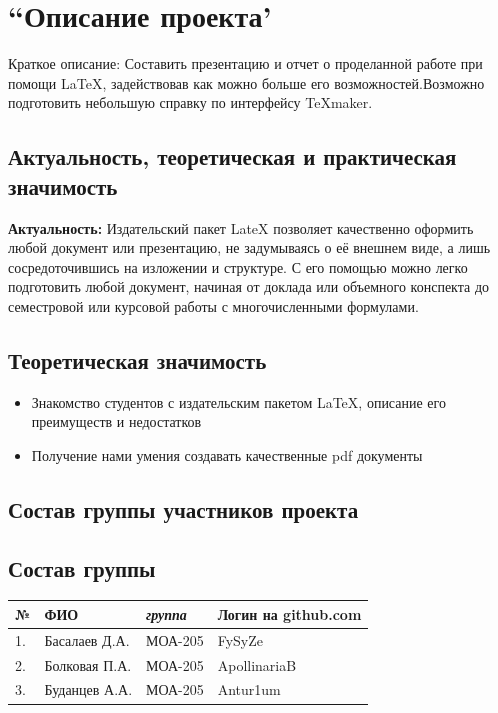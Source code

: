 \documentclass[14pt, a4paper]{extarticle}
\begin{document}
\newpage%
\tableofcontents


\newpage%
\section{``Описание проекта'}
Краткое описание: Составить презентацию и отчет о проделанной работе при помощи \LaTeX, задействовав как можно больше его возможностей.Возможно подготовить небольшую справку по интерфейсу \TeX maker.
\subsection{Актуальность, теоретическая и практическая значимость}
\textbf{Актуальность:}
Издательский пакет LateX позволяет качественно оформить любой документ или презентацию, не задумываясь о её внешнем виде, а лишь сосредоточившись на изложении и структуре. С его помощью можно легко подготовить любой документ, начиная от доклада или объемного конспекта до семестровой или курсовой работы с многочисленными формулами.
\subsection{Теоретическая значимость}
\begin{itemize}
  \item Знакомство студентов с издательским пакетом \LaTeX, описание его преимуществ и недостатков
 \item Получение нами умения создавать качественные pdf документы
\end{itemize} 
\subsection{Состав группы участников проекта}
\subsection*{Состав группы}
\begin{tabular}{| l| l| l| l|}
\hline {\bfseries \large №} & {\bfseries \large ФИО} & {\bfseries \large \textsl{группа}} & {\bfseries \large Логин на github.com } \\ \hline
1. & Басалаев Д.А.  & МОА-205 & FySyZe \\ \hline
2. & Болковая П.А.  & МОА-205 & ApollinariaB \\ \hline
3. & Буданцев А.А.  & МОА-205 & Antur1um \\ \hline
\end{tabular}
\end{document}

